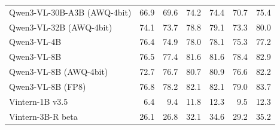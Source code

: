 \begin{table}[t]
\begin{tabular}{lrrrrrr}
Qwen3-VL-30B-A3B (AWQ-4bit) & 66.9 & 69.6 & 74.2 & 74.4 & 70.7 & 75.4 \\
Qwen3-VL-32B (AWQ-4bit) & 74.1 & 73.7 & 78.8 & 79.1 & 73.3 & 80.0 \\
Qwen3-VL-4B & 76.4 & 74.9 & 78.0 & 78.1 & 75.3 & 77.2 \\
Qwen3-VL-8B & 76.5 & 77.4 & 81.6 & 81.6 & 78.4 & 82.9 \\
Qwen3-VL-8B (AWQ-4bit) & 72.7 & 76.7 & 80.7 & 80.9 & 76.6 & 82.2 \\
Qwen3-VL-8B (FP8) & 76.8 & 78.2 & 82.1 & 82.1 & 79.0 & 83.7 \\
Vintern-1B v3.5 & 6.4 & 9.4 & 11.8 & 12.3 & 9.5 & 12.3 \\
Vintern-3B-R beta & 26.1 & 26.8 & 32.1 & 34.6 & 29.2 & 35.2 \\
\bottomrule
\end{tabular}
\end{table}
